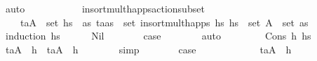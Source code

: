 \begin{isabellebody}
\ auto\isanewline
\ \ \ \ \isamarkupfalse%
\isanewline
\ \ \isamarkupfalse%
%
\endisatagproof
{\isafoldproof}%
%
\isadelimproof
\isanewline
%
\endisadelimproof
\isanewline
\ \ \isamarkupfalse%
\ insort{\isacharunderscore}{\kern0pt}mult{\isacharunderscore}{\kern0pt}happs{\isacharunderscore}{\kern0pt}action{\isacharunderscore}{\kern0pt}subset{}{\isacharcolon}{\kern0pt}\ \isanewline
\ \ \ \ {\isachardoublequoteopen}{\isacharparenleft}{\kern0pt}t\isactrlsub a{\isacharcomma}{\kern0pt}A{\isacharparenright}{\kern0pt}\ {\isasymin}\ set\ hs\ {\isasymLongrightarrow}\ {\isasymexists}as{\isacharprime}{\kern0pt}{\isachardot}{\kern0pt}\ {\isacharparenleft}{\kern0pt}t\isactrlsub a{\isacharcomma}{\kern0pt}as{\isacharprime}{\kern0pt}{\isacharparenright}{\kern0pt}\ {\isasymin}\ set\ {\isacharparenleft}{\kern0pt}insort{\isacharunderscore}{\kern0pt}mult{\isacharunderscore}{\kern0pt}happs\ hs\ hs\ {\isasymand}\ set\ A\ {\isasymsubseteq}\ set\ as{\isacharprime}{\kern0pt}{\isachardoublequoteclose}\isanewline
%
\isadelimproof
\ \ %
\endisadelimproof
%
\isatagproof
{}\isamarkupfalse%
\ {\isacharparenleft}{\kern0pt}induction\ hs\isanewline
\ \ \ \ \isamarkupfalse%
\ Nil\isanewline
\ \ \ \ \isamarkupfalse%
\ \isamarkupfalse%
\ {\isacharquery}{\kern0pt}case\isanewline
\ \ \ \ \ \ \isamarkupfalse%
\ auto\isanewline
\ \ \isamarkupfalse%
\isanewline
\ \ \ \ \isamarkupfalse%
\ {\isacharparenleft}{\kern0pt}Cons\ h\ hs\isanewline
\ \ \ \ \isamarkupfalse%
\ {\isachardoublequoteopen}{\isacharparenleft}{\kern0pt}t\isactrlsub a{\isacharcomma}{\kern0pt}A{\isacharparenright}{\kern0pt}\ {\isacharequal}{\kern0pt}\ h\ {\isasymor}\ {\isacharparenleft}{\kern0pt}t\isactrlsub a{\isacharcomma}{\kern0pt}A{\isacharparenright}{\kern0pt}\ {\isasymnoteq}\ h{\isachardoublequoteclose}\isanewline
\ \ \ \ \ \ \isamarkupfalse%
\ simp\isanewline
\ \ \ \ \isamarkupfalse%
\ \isamarkupfalse%
\ {\isacharquery}{\kern0pt}case\isanewline
\ \ \ \ \isamarkupfalse%
\isanewline
\ \ \ \ \ \ \isamarkupfalse%
\ {\isachardoublequoteopen}{\isacharparenleft}{\kern0pt}t\isactrlsub a{\isacharcomma}{\kern0pt}A{\isacharparenright}{\kern0pt}\ {\isacharequal}{\kern0pt}\ h{\isachardoublequoteclose}\isanewline

\end{isabellebody}
